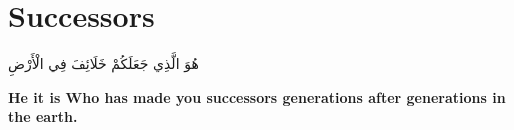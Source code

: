 \chapter{Successors}
\begin{center}
    {\Huge    
        \begin{Arabic}
            هُوَ الَّذِي جَعَلَكُمْ خَلَائِفَ فِي الْأَرْضِ
        \end{Arabic}
    }
\end{center}
\vspace*{\fill}
\vspace{3cm}
\begin{center}
    \large \textbf{He it is Who has made you successors generations after generations in the earth.}
\end{center}
